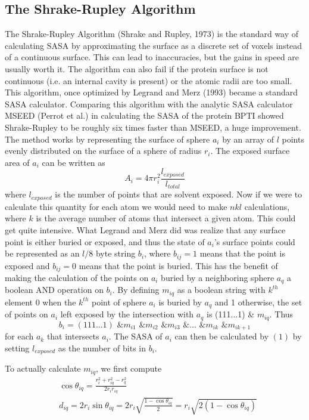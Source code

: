 \documentclass{article}
\begin{document}
\subsection{The Shrake-Rupley Algorithm}
The Shrake-Rupley Algorithm (Shrake and Rupley, 1973) is the standard way of calculating SASA by approximating the surface as a discrete set of voxels instead of a continuous surface. This can lead to inaccuracies, but the gains in speed are usually worth it. The algorithm can also fail if the protein surface is not continuous (i.e. an internal cavity is present) or the atomic radii are too small. This algorithm, once optimized by Legrand and Merz (1993) became a standard SASA calculator. Comparing this algorithm with the analytic SASA calculator MSEED (Perrot et al.) in calculating the SASA of the protein BPTI showed Shrake-Rupley to be roughly six times faster than MSEED, a huge improvement. The method works by representing the surface of sphere $a_i$ by an array of $l$ points evenly distributed on the surface of a sphere of radius $r_i$. The exposed surface area of $a_i$ can be written as
\begin{equation}
A_i=4\pi r_i^2\frac{l_{exposed}}{l_{total}} 
\end{equation}
where $l_{exposed}$ is the number of points that are solvent exposed. Now if we were to calculate this quantity for each atom we would need to make $nkl$ calculations, where $k$ is the average number of atoms that intersect a given atom. This could get quite intensive. What Legrand and Merz did was realize that any surface point is either buried or exposed, and thus the state of $a_i$'s surface points could be represented as an $l/8$ byte string $b_i$, where $b_{ij}=1$ means that the point is exposed and $b_{ij}=0$ means that the point is buried. This has the benefit of making the calculation of the points on $a_i$ buried by a neighboring sphere $a_q$ a boolean AND operation on $b_i$. By defining $m_{iq}$ as a boolean string with $k^{th}$ element 0 when the $k^{th}$ point of sphere $a_i$ is buried by $a_q$ and 1 otherwise, the set of points on $a_i$ left exposed by the intersection with $a_q$ is (111...1) \& $m_{iq}$. Thus 
\begin{equation*}
b_i=(111...1) \text{ \& } m_{i1} \text{ \& } m_{i2} \text{ \& } m_{i3} \text{ \& }...\text{ \& } m_{ik} \text{ \& } m_{ik+1}
\end{equation*}
for each $a_k$ that intersects $a_i$.
The SASA of $a_i$ can then be calculated by $(1)$ by setting $l_{exposed}$ as the number of bits in $b_i$. \par
To actually calculate $m_{iq}$, we first compute 
\begin{align}
&\cos\theta_{iq}=\frac{r_i^2+r_{iq}^2-r_q^2}{2r_ir_{iq}} \\
&d_{iq}=2r_i\sin\theta_{iq}=2r_i\sqrt{\frac{1-\cos\theta_{iq}}{2}}=r_i\sqrt{2(1-\cos\theta_{iq})}
\end{align}
\end{document}
